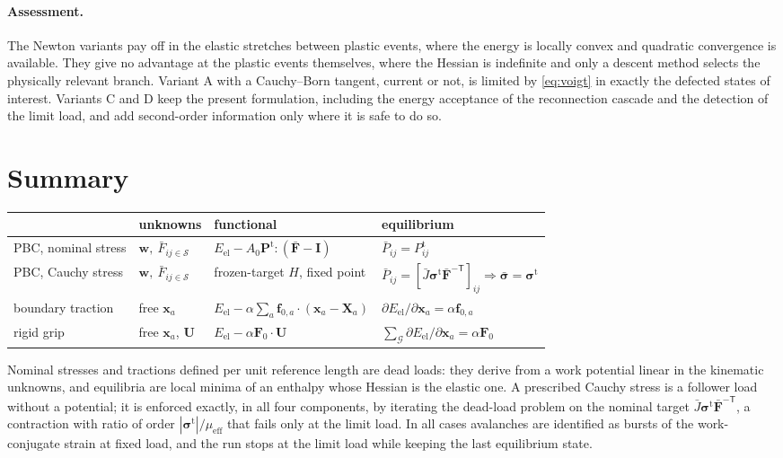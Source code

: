 \documentclass[11pt,a4paper]{article}
\newcommand{\Fb}{\bar{\mathbf F}}
\newcommand{\sigb}{\bar{\bm\sigma}}
\newcommand{\Pt}{\mathbf P^{\mathrm t}}
\newcommand{\sigt}{\bm\sigma^{\mathrm t}}
\newcommand{\I}{\mathbf I}
\newcommand{\x}{\mathbf x}
\newcommand{\X}{\mathbf X}
\newcommand{\w}{\mathbf w}
\newcommand{\f}{\mathbf f}
\newcommand{\U}{\mathbf U}
\begin{document}
\paragraph{Assessment.}
The Newton variants pay off in the elastic stretches between plastic events, where the energy is
locally convex and quadratic convergence is available. They give no advantage at the plastic events
themselves, where the Hessian is indefinite and only a descent method selects the physically
relevant branch. Variant A with a Cauchy--Born tangent, current or not, is limited by
\eqref{eq:voigt} in exactly the defected states of interest. Variants C and D keep the present
formulation, including the energy acceptance of the reconnection cascade and the detection of the
limit load, and add second-order information only where it is safe to do so.

\section{Summary}

\begin{table}[ht]
\centering\small
\begin{tabular}{@{}llll@{}}
\toprule
& unknowns & functional & equilibrium\\
\midrule
PBC, nominal stress & \(\w,\ \bar F_{ij\in\mathcal S}\) & \(E_{\mathrm{el}}-A_0\Pt:(\Fb-\I)\) & \(\bar P_{ij}=P^{\mathrm t}_{ij}\)\\
PBC, Cauchy stress & \(\w,\ \bar F_{ij\in\mathcal S}\) & frozen-target \(H\), fixed point &
  \(\bar P_{ij}=[\bar J\sigt\Fb^{-\mathsf T}]_{ij}\Rightarrow\sigb=\sigt\)\\
boundary traction & free \(\x_a\) & \(E_{\mathrm{el}}-\alpha\sum_a\f_{0,a}\cdot(\x_a-\X_a)\) &
  \(\partial E_{\mathrm{el}}/\partial\x_a=\alpha\f_{0,a}\)\\
rigid grip & free \(\x_a\), \(\U\) & \(E_{\mathrm{el}}-\alpha\mathbf F_0\cdot\U\) &
  \(\sum_{\mathcal G}\partial E_{\mathrm{el}}/\partial\x_a=\alpha\mathbf F_0\)\\
\bottomrule
\end{tabular}
\end{table}

Nominal stresses and tractions defined per unit reference length are dead loads: they derive from
a work potential linear in the kinematic unknowns, and equilibria are local minima of an enthalpy
whose Hessian is the elastic one. A prescribed Cauchy stress is a follower load without a
potential; it is enforced exactly, in all four components, by iterating the dead-load problem on
the nominal target \(\bar J\sigt\Fb^{-\mathsf T}\), a contraction with ratio of order
\(|\sigt|/\mu_{\mathrm{eff}}\) that fails only at the limit load. In all cases avalanches are
identified as bursts of the work-conjugate strain at fixed load, and the run stops at the limit
load while keeping the last equilibrium state.
\end{document}
